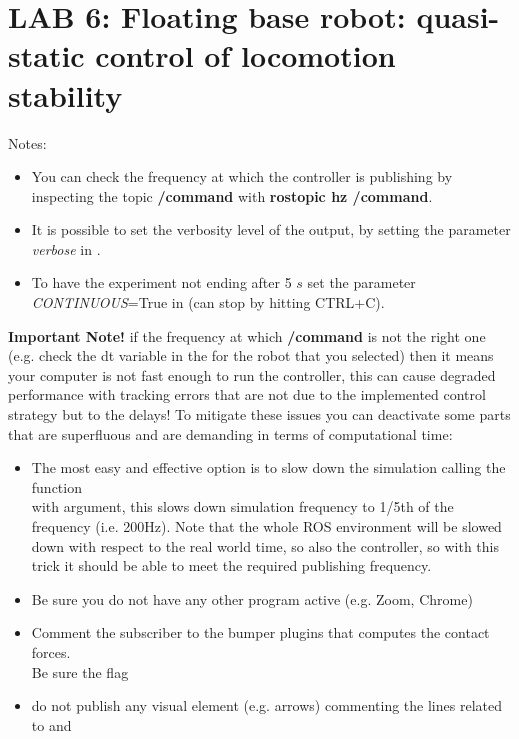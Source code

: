 \documentclass[11pt]{article}
\begin{document}
\section*{LAB 6: Floating base robot: quasi-static control of locomotion stability}

\noindent  Notes:
\begin{itemize}
	\item You can check the frequency at which the controller is publishing by inspecting the topic \textbf{/command} with \textbf{rostopic hz /command}.
	\item It is possible to set the verbosity level of the output, by setting the parameter  \textit{verbose} in  .
	\item To have the experiment not ending after 5 $s$ set the parameter \textit{CONTINUOUS}=True in   (can stop by hitting CTRL+C).
\end{itemize}

\noindent  \textbf{Important Note!} if the frequency at which \textbf{/command} is not the right one (e.g. check the dt variable in the  for the robot that you selected) then it means your computer is not fast enough to run the controller, this can cause degraded performance with tracking errors that are not due to the implemented control strategy but to the delays! To mitigate these issues you can deactivate some parts that are superfluous and are demanding in terms of computational time:

\begin{itemize}
	\item The most easy and effective option is to slow down the simulation calling the  function \\
	with  argument, this slows down  simulation frequency to 1/5th of the frequency (i.e. 200Hz). Note that the whole ROS environment will be slowed down with respect to the real world time, so also the controller, so with this trick it should be able to meet the required publishing frequency. 
	\item Be sure you do not have any other program active (e.g. Zoom, Chrome)
	\item Comment the subscriber to the bumper plugins that computes the contact forces. \\ Be sure the flag  
	\item do not publish any visual element (e.g. arrows) commenting the lines related to  and 

\end{itemize}
\end{document}
